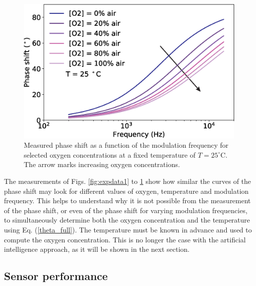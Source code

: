 \documentclass[9pt,twocolumn,twoside,pdftex]{optica}
\begin{document}
\begin{figure}[t!]
\centering
\includegraphics[width=8.2 cm]{phase_f_O2.eps}
\caption{Measured phase shift as a function of the modulation frequency for selected oxygen concentrations at a fixed temperature of $T=25 ^{\circ}$C. The arrow marks increasing oxygen concentrations.}
\label{fig:expdata3}
\end{figure}

The measurements of Figs. \ref{fig:expdata1} to \ref{fig:expdata3} show how similar the curves of the phase shift may look for different values of oxygen, temperature and modulation frequency. This helps to understand why it is not possible from the measurement of the phase shift, or even of the phase shift for varying modulation frequencies, to simultaneously determine both the oxygen concentration and the temperature using Eq. (\ref{theta_full}). The temperature must be known in advance and used to compute the oxygen concentration. This is no longer the case with the artificial intelligence approach, as it will be shown in the next section. 


\subsection{Sensor performance}
\end{document}
